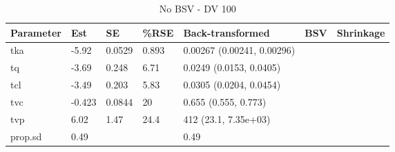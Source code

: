 \begin{table}
\centering\centering
\caption{No BSV - DV 100}
\centering
\fontsize{8}{10}\selectfont
\begin{tabular}[t]{lllllll}
\toprule
\textbf{Parameter} & \textbf{Est} & \textbf{SE} & \textbf{\%RSE} & \textbf{Back-transformed} & \textbf{BSV} & \textbf{Shrinkage}\\
\midrule
tka & -5.92 & 0.0529 & 0.893 & 0.00267 (0.00241, 0.00296) &  & \\
\midrule
tq & -3.69 & 0.248 & 6.71 & 0.0249 (0.0153, 0.0405) &  & \\
\midrule
tcl & -3.49 & 0.203 & 5.83 & 0.0305 (0.0204, 0.0454) &  & \\
\midrule
tvc & -0.423 & 0.0844 & 20 & 0.655 (0.555, 0.773) &  & \\
\midrule
tvp & 6.02 & 1.47 & 24.4 & 412 (23.1, 7.35e+03) &  & \\
\midrule
prop.sd & 0.49 &  &  & 0.49 &  & \\
\bottomrule
\end{tabular}
\end{table}